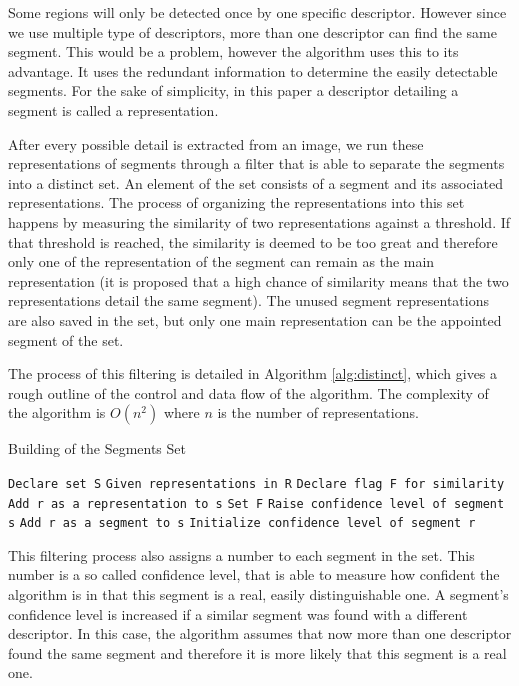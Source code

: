 Some regions will only be detected once by one specific descriptor. However since we use multiple type of descriptors, more than one descriptor can find the same segment. This would be a problem, however the algorithm uses this to its advantage. It uses the redundant information to determine the easily detectable segments. For the sake of simplicity, in this paper a descriptor detailing a segment is called a representation.

After every possible detail is extracted from an image, we run these representations of segments through a filter that is able to separate the segments into a distinct set. An element of the set consists of a segment and its associated representations. The process of organizing the representations into this set happens by measuring the similarity of two representations against a threshold. If that threshold is reached, the similarity is deemed to be too great and therefore only one of the representation of the segment can remain as the main representation (it is proposed that a high chance of similarity means that the two representations detail the same segment). The unused segment representations are also saved in the set, but only one main representation can be the appointed segment of the set.

The process of this filtering is detailed in Algorithm \ref{alg:distinct}, which gives a rough outline of the control and data flow of the algorithm. The complexity of the algorithm is $O(n^2)$ where $n$ is the number of representations.
\begin{algorithm}[H]
\caption{Building of the Segments Set}\label{alg:distinct}
\begin{algorithmic}
    \State \texttt{Declare set S}
    \State \texttt{Given representations in R}
        \State \texttt{Declare flag F for similarity}
                \State \texttt{Add r as a representation to s}
                \State \texttt{Set F}
                \State \texttt{Raise confidence level of segment s}
            \EndIf
        \EndFor
            \State \texttt{Add r as a segment to s}
            \State \texttt{Initialize confidence level of segment r}
        \EndIf
    \EndFor
\end{algorithmic}
\end{algorithm}


This filtering process also assigns a number to each segment in the set. This number is a so called confidence level, that is able to measure how confident the algorithm is in that this segment is a real, easily distinguishable one. A segment's confidence level is increased if a similar segment was found with a different descriptor. In this case, the algorithm assumes that now more than one descriptor found the same segment and therefore it is more likely that this segment is a real one. 


